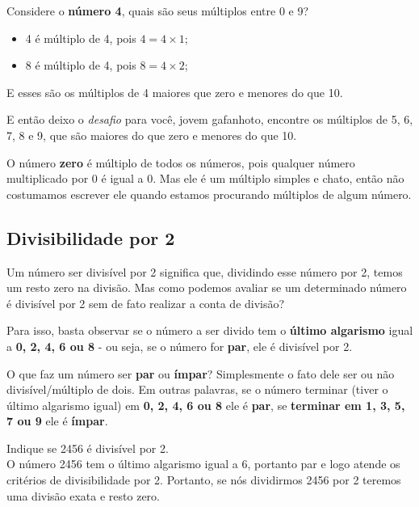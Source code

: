 \begin{exemplo}
    Considere o \textbf{número 4}, quais são seus múltiplos entre 0 e 9?

    \begin{itemize}
        \item 4 é múltiplo de 4, pois \(4=4\times1\);
        \item 8 é múltiplo de 4, pois \(8=4\times2\);
    \end{itemize}

    E esses são os múltiplos de 4 maiores que zero e menores do que 10.
\end{exemplo}

E então deixo o \textit{desafio} para você, jovem gafanhoto, encontre os múltiplos de 5, 6, 7, 8 e 9, que são maiores do que zero e menores do que 10.

\begin{tcolorbox}[title = IMPORTANTE]
    O número \textbf{zero} é múltiplo de todos os números, pois qualquer número multiplicado por 0 é igual a 0. Mas ele é um múltiplo simples e chato, então não costumamos escrever ele quando estamos procurando múltiplos de algum número.
\end{tcolorbox}


\subsection{Divisibilidade por 2}

Um número ser divisível por 2 significa que, dividindo esse número por 2, temos um resto zero na divisão. Mas como podemos avaliar se um determinado número é divisível por 2 sem de fato realizar a conta de divisão?

Para isso, basta observar se o número a ser divido tem o \textbf{último algarismo} igual a \textbf{0, 2, 4, 6 ou 8} - ou seja, se o número for \textbf{par}, ele é divisível por 2.

\begin{tcolorbox}[title=IMPORTANTE]
    O que faz um número ser \textbf{par} ou \textbf{ímpar}? Simplesmente o fato dele ser ou não divisível/múltiplo de dois. Em outras palavras, se o número terminar (tiver o último algarismo igual) em \textbf{0, 2, 4, 6 ou 8} ele é \textbf{par}, se \textbf{terminar em 1, 3, 5, 7 ou 9} ele é \textbf{ímpar}.
\end{tcolorbox}

\begin{exemplo}
    Indique se 2456 é divisível por 2. \\

    O número 2456 tem o último algarismo igual a 6, portanto par e logo atende os critérios de divisibilidade por 2. Portanto, se nós dividirmos 2456 por 2 teremos uma divisão exata e resto zero.
\end{exemplo}

